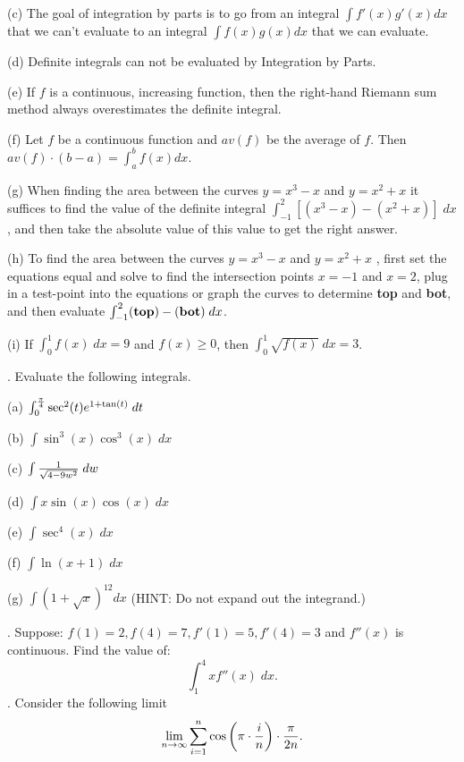 \documentclass[12pt]{article}
\begin{document}
\noindent (c) The goal of integration by parts is to go from an integral $\int 
f'(x) g'(x) dx$ that we can't evaluate to an integral $\int f(x) g(x) 
dx$ that we can evaluate.

\noindent (d) Definite integrals can not be evaluated by Integration by Parts.

\noindent (e) If $f$ is a continuous, increasing function, then the right-hand 
Riemann sum method always overestimates the definite integral.

\noindent (f)  Let $f$ be a continuous function and $av(f)$ be the 
average of $f$. Then $av(f) \cdot (b-a) =\int_{a}^{b} f(x)dx$.

\noindent (g) When finding the area between the curves $y=x^3-x$ 
and $y=x^2+x$ it suffices to find the value of the definite integral $\int_{-1}^2 
\left [ (x^3 - x) - (x^2+x) \right ] \; dx$, and then take the absolute value of 
this value to get the right answer.

\noindent (h) To find the area between the curves $y=x^3-x$ and 
$y=x^2+x$ , first set the equations equal and solve to find the intersection points 
$x=-1$ and $x=2$,  plug in a test-point into the equations or graph the curves to 
determine {\bf top} and {\bf bot}, and then evaluate $\int_{-1}^2 
({\bf top}) - ({\bf bot}) \; dx$.

\noindent (i) If $\int_0^1 f(x) \; dx = 9$ and $f(x) \ge 0$, then 
$\int_0^1 \sqrt{f(x)} \; dx = 3$.

\bigskip 
{}.  Evaluate the following integrals.

\noindent (a) $\int_{0}^{{{\pi}\over{4}}} \sec ^2 (t) e^{1+\tan (t)} \; dt$

\noindent (b) $\int \sin^3(x)\cos^3(x) \; dx$

\noindent (c) $\int {{1}\over{\sqrt{4-9w^2}}} \; dw$

\noindent (d) $\int x \sin (x) \cos (x) \; dx$

\noindent (e) $\int \sec^4(x) \; dx$

\noindent (f) $\int \ln (x+1) \; dx$

\noindent (g) $\int \left(1+\sqrt{x}\right)^{12} dx$ (HINT: Do not expand out the integrand.)

\bigskip
{}. Suppose: $f(1)=2, f(4)=7, f'(1)=5, f'(4)=3$ and $f''(x)$ is 
continuous. Find the value of:
$$\int _1^4 x f''(x) \; dx.$$
\bigskip
{}.   Consider the following limit
$$\lim_{n\to\infty} \sum_{i=1}^{n} \cos \left (\pi\cdot 
{{i}\over{n}} \right )\cdot{{\pi}\over{2n}}.$$
\end{document}
